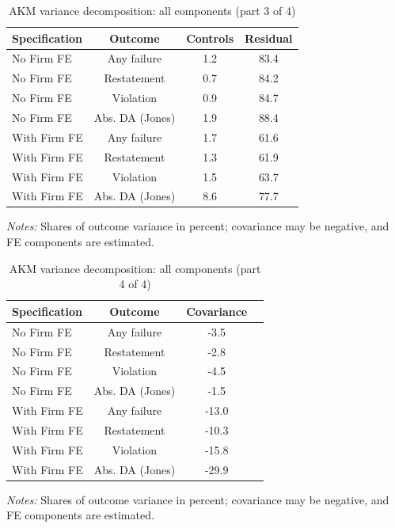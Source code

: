 \begin{table}[htbp]
\footnotesize
\centering
\caption{AKM variance decomposition: all components (part 3 of 4)}
\begin{threeparttable}
\begin{tabular}{p{}ccc}
\toprule
Specification & Outcome & Controls & Residual \\
\midrule
No Firm FE & Any failure & 1.2 & 83.4 \\
No Firm FE & Restatement & 0.7 & 84.2 \\
No Firm FE & Violation & 0.9 & 84.7 \\
No Firm FE & Abs. DA (Jones) & 1.9 & 88.4 \\
With Firm FE & Any failure & 1.7 & 61.6 \\
With Firm FE & Restatement & 1.3 & 61.9 \\
With Firm FE & Violation & 1.5 & 63.7 \\
With Firm FE & Abs. DA (Jones) & 8.6 & 77.7 \\
\bottomrule
\end{tabular}
\begin{tablenotes}\footnotesize
\item \raggedright \textit{Notes:} Shares of outcome variance in percent; covariance may be negative, and FE components are estimated.
\end{tablenotes}
\end{threeparttable}
\end{table}

\begin{table}[htbp]
\footnotesize
\centering
\caption{AKM variance decomposition: all components (part 4 of 4)}
\begin{threeparttable}
\begin{tabular}{p{}ccc}
\toprule
Specification & Outcome & Covariance &  \\
\midrule
No Firm FE & Any failure & -3.5 &  \\
No Firm FE & Restatement & -2.8 &  \\
No Firm FE & Violation & -4.5 &  \\
No Firm FE & Abs. DA (Jones) & -1.5 &  \\
With Firm FE & Any failure & -13.0 &  \\
With Firm FE & Restatement & -10.3 &  \\
With Firm FE & Violation & -15.8 &  \\
With Firm FE & Abs. DA (Jones) & -29.9 &  \\
\bottomrule
\end{tabular}
\begin{tablenotes}\footnotesize
\item \raggedright \textit{Notes:} Shares of outcome variance in percent; covariance may be negative, and FE components are estimated.
\end{tablenotes}
\end{threeparttable}
\end{table}
